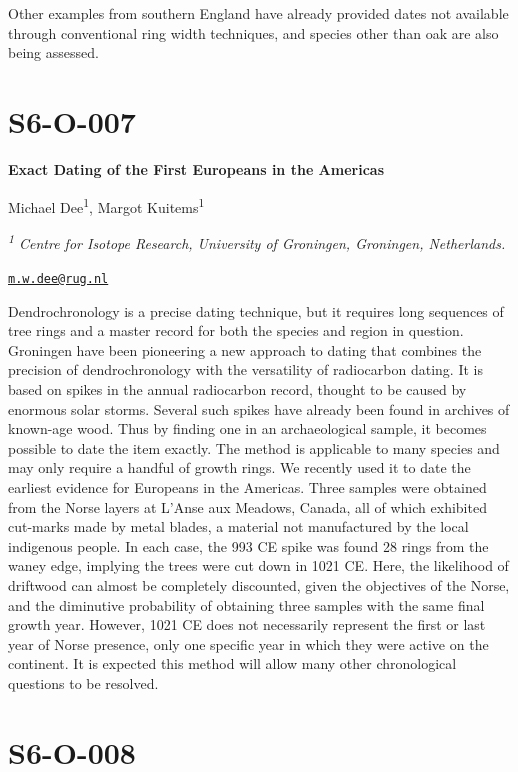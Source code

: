 \documentclass[
]{book}
\begin{document}
Other examples from southern England have already provided dates not available through conventional ring width techniques, and species other than oak are also being assessed.

\hypertarget{s6-o-007}{%
\section*{S6-O-007}\label{s6-o-007}}

\textbf{Exact Dating of the First Europeans in the Americas}

Michael Dee\textsuperscript{1}, Margot Kuitems\textsuperscript{1}

\emph{\textsuperscript{1} Centre for Isotope Research, University of Groningen, Groningen, Netherlands.}

\href{mailto:m.w.dee@rug.nl}{\nolinkurl{m.w.dee@rug.nl}}

Dendrochronology is a precise dating technique, but it requires long sequences of tree rings and a master record for both the species and region in question. Groningen have been pioneering a new approach to dating that combines the precision of dendrochronology with the versatility of radiocarbon dating. It is based on spikes in the annual radiocarbon record, thought to be caused by enormous solar storms. Several such spikes have already been found in archives of known-age wood. Thus by finding one in an archaeological sample, it becomes possible to date the item exactly. The method is applicable to many species and may only require a handful of growth rings. We recently used it to date the earliest evidence for Europeans in the Americas. Three samples were obtained from the Norse layers at L'Anse aux Meadows, Canada, all of which exhibited cut-marks made by metal blades, a material not manufactured by the local indigenous people. In each case, the 993 CE spike was found 28 rings from the waney edge, implying the trees were cut down in 1021 CE. Here, the likelihood of driftwood can almost be completely discounted, given the objectives of the Norse, and the diminutive probability of obtaining three samples with the same final growth year. However, 1021 CE does not necessarily represent the first or last year of Norse presence, only one specific year in which they were active on the continent. It is expected this method will allow many other chronological questions to be resolved.

\hypertarget{s6-o-008}{%
\section*{S6-O-008}\label{s6-o-008}}
\end{document}
